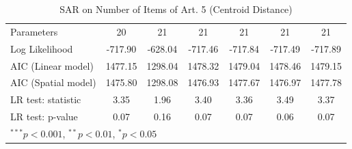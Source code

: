 \begin{table}[!h]
\begin{center}
\begin{tabular}{l c c c c c c }
Parameters              & 20           & 21           & 21           & 21           & 21           & 21           \\
Log Likelihood          & -717.90      & -628.04      & -717.46      & -717.84      & -717.49      & -717.89      \\
AIC (Linear model)      & 1477.15      & 1298.04      & 1478.32      & 1479.04      & 1478.46      & 1479.15      \\
AIC (Spatial model)     & 1475.80      & 1298.08      & 1476.93      & 1477.67      & 1476.97      & 1477.78      \\
LR test: statistic      & 3.35         & 1.96         & 3.40         & 3.36         & 3.49         & 3.37         \\
LR test: p-value        & 0.07         & 0.16         & 0.07         & 0.07         & 0.06         & 0.07         \\
\bottomrule
\multicolumn{7}{l}{\scriptsize{$^{***}p<0.001$, $^{**}p<0.01$, $^*p<0.05$}}
\end{tabular}
\caption{SAR on Number of Items of Art. 5 (Centroid Distance)}
\label{table:coefficients}
\end{center}
\end{table}

